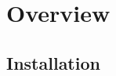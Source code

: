 \section{Overview}\label{sec:flea:overview}
\subsection{Installation}\label{sec:flea:installation}






